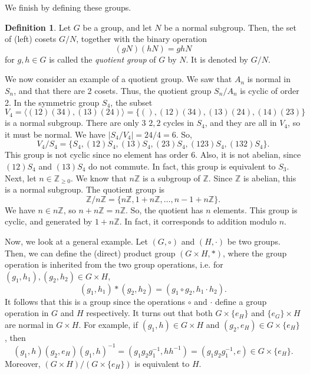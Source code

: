 \documentclass[a4paper, openany]{memoir}
\theoremstyle{definition}
\newtheorem{definition}{Definition}[section]
\theoremstyle{plain}
\begin{document}
\noindent We finish by defining these groups.
\begin{definition}
Let $G$ be a group, and let $N$ be a normal subgroup. Then, the set of (left) cosets $G/N$, together with the binary operation
\[(gN)(hN) = ghN\]
for $g, h \in G$ is called the \emph{quotient group} of $G$ by $N$. It is denoted by $G/N$.
\end{definition}

We now consider an example of a quotient group. We saw that $A_n$ is normal in $S_n$, and that there are 2 cosets. Thus, the quotient group $S_n/A_n$ is cyclic of order 2. In the symmetric group $S_4$, the subset
\[V_4 = \langle (12)(34), (13)(24) \rangle = \{(), (12)(34), (13)(24), (14)(23)\}\]
is a normal subgroup. There are only 3 $2,2$ cycles in $S_4$, and they are all in $V_4$, so it must be normal. We have $|S_4/V_4| = 24/4 = 6$. So,
\[V_4/S_4 = \{S_4, (12)S_4, (13)S_4, (23)S_4, (123)S_4, (132)S_4\}.\]
This group is not cyclic since no element has order 6. Also, it is not abelian, since $(12)S_4$ and $(13)S_4$ do not commute. In fact, this group is equivalent to $S_3$. Next, let $n \in \mathbb{Z}_{\geqslant 0}$. We know that $n \mathbb{Z}$ is a subgroup of $\mathbb{Z}$. Since $\mathbb{Z}$ is abelian, this is a normal subgroup. The quotient group is 
\[\mathbb{Z}/n \mathbb{Z} = \{n \mathbb{Z}, 1 + n \mathbb{Z}, \dots, n-1 + n \mathbb{Z}\}.\]
We have $n \in n \mathbb{Z}$, so $n + n \mathbb{Z} = n \mathbb{Z}$. So, the quotient has $n$ elements. This group is cyclic, and generated by $1 + n \mathbb{Z}$. In fact, it corresponds to addition modulo $n$. 

Now, we look at a general example. Let $(G, \circ)$ and $(H, \cdot)$ be two groups. Then, we can define the (direct) product group $(G \times H, *)$, where the group operation is inherited from the two group operations, i.e. for $(g_1, h_1), (g_2, h_2) \in G \times H$,
\[(g_1, h_1) * (g_2, h_2) = (g_1 \circ g_2, h_1 \cdot h_2).\]
It follows that this is a group since the operations $\circ$ and $\cdot$ define a group operation in $G$ and $H$ respectively. It turns out that both $G \times \{e_H\}$ and $\{e_G\} \times H$ are normal in $G \times H$. For example, if $(g_1, h) \in G \times H$ and $(g_2, e_H) \in G \times \{e_H\}$, then
\[(g_1, h)(g_2, e_H)(g_1, h)^{-1} = (g_1g_2g_1^{-1}, hh^{-1}) = (g_1g_2g_1^{-1}, e) \in G \times \{e_H\}.\]
Moreover, $(G \times H)/(G \times \{e_H\})$ is equivalent to $H$.
\end{document}
